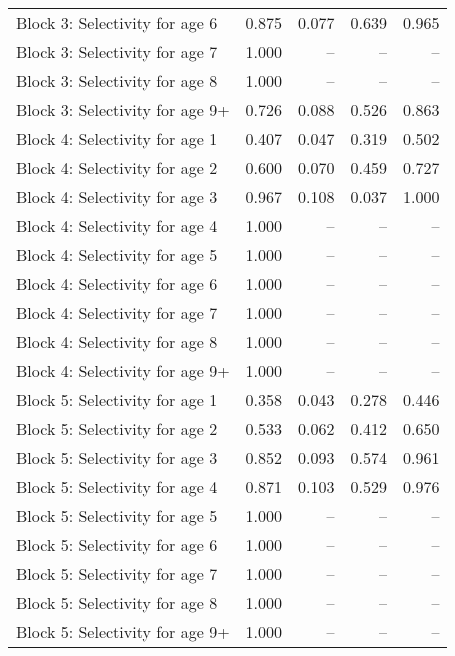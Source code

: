 \documentclass[
]{article}
\begin{document}
\begin{landscape}
\begin{longtable}[t]{lrrrr}
\addlinespace
Block 3: Selectivity for age 6 & 0.875 & 0.077 & 0.639 & 0.965\\
Block 3: Selectivity for age 7 & 1.000 & -- & -- & --\\
Block 3: Selectivity for age 8 & 1.000 & -- & -- & --\\
Block 3: Selectivity for age 9+ & 0.726 & 0.088 & 0.526 & 0.863\\
Block 4: Selectivity for age 1 & 0.407 & 0.047 & 0.319 & 0.502\\
\addlinespace
Block 4: Selectivity for age 2 & 0.600 & 0.070 & 0.459 & 0.727\\
Block 4: Selectivity for age 3 & 0.967 & 0.108 & 0.037 & 1.000\\
Block 4: Selectivity for age 4 & 1.000 & -- & -- & --\\
Block 4: Selectivity for age 5 & 1.000 & -- & -- & --\\
Block 4: Selectivity for age 6 & 1.000 & -- & -- & --\\
\addlinespace
Block 4: Selectivity for age 7 & 1.000 & -- & -- & --\\
Block 4: Selectivity for age 8 & 1.000 & -- & -- & --\\
Block 4: Selectivity for age 9+ & 1.000 & -- & -- & --\\
Block 5: Selectivity for age 1 & 0.358 & 0.043 & 0.278 & 0.446\\
Block 5: Selectivity for age 2 & 0.533 & 0.062 & 0.412 & 0.650\\
\addlinespace
Block 5: Selectivity for age 3 & 0.852 & 0.093 & 0.574 & 0.961\\
Block 5: Selectivity for age 4 & 0.871 & 0.103 & 0.529 & 0.976\\
Block 5: Selectivity for age 5 & 1.000 & -- & -- & --\\
Block 5: Selectivity for age 6 & 1.000 & -- & -- & --\\
Block 5: Selectivity for age 7 & 1.000 & -- & -- & --\\
\addlinespace
Block 5: Selectivity for age 8 & 1.000 & -- & -- & --\\
Block 5: Selectivity for age 9+ & 1.000 & -- & -- & --\\*
\end{longtable}
\end{landscape}
\end{document}
